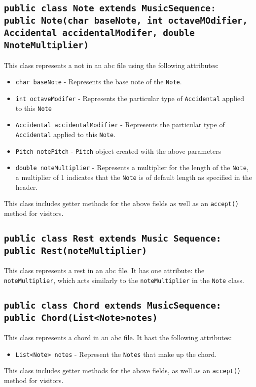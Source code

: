\documentclass{article}
\begin{document}
\subsection*{{\tt public class Note extends MusicSequence: \\ public Note(char baseNote, int octaveMOdifier,\\ Accidental accidentalModifer, double NnoteMultiplier)}}
This class represents a not in an abc file using the following attributes:
\begin{itemize}
\item {\tt char baseNote} - Represents the base note of the {\tt Note}.
\item {\tt int octaveModifer} - Represents the particular type of {\tt Accidental} applied to this {\tt Note}
\item {\tt Accidental accidentalModifier} - Represents the particular type of {\tt Accidental} applied to this {\tt Note}.
\item {\tt Pitch notePitch} - {\tt Pitch} object created with the above parameters
\item {\tt double noteMultiplier} - Represents a multiplier for the length of the {\tt Note}, a multiplier of 1 indicates that the {\tt Note} is of default length as specified in the header.
\end{itemize}
This class includes getter methods for the above fields as well as an {\tt accept() } method for visitors.
\subsection*{{\tt public class Rest extends Music Sequence: public Rest(noteMultiplier) }}
	This class represents a rest in an abc file. It has one attribute: the {\tt  noteMultiplier}, which acts similarly to the {\tt noteMultiplier} in the {\tt Note} class.
\subsection*{{\tt public class Chord extends MusicSequence: \\
			public Chord(List<Note>notes)}}	
This class represents a chord in an abc file. It hast the following attributes:
\begin{itemize}
\item {\tt  List<Note> notes} - Represent the {\tt Notes} that make up the chord.
\end{itemize}
This class includes getter methods for the above fields, as well as an {\tt accept()} method for visitors.
\end{document}

